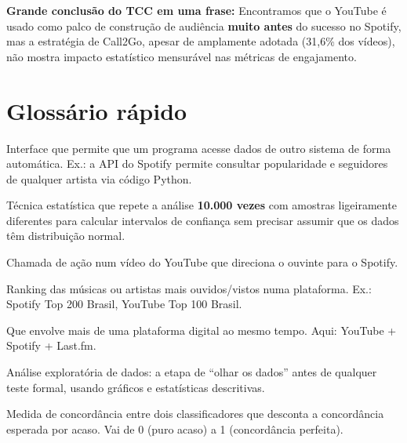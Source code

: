 \documentclass[12pt,a4paper]{article}
\newcommand{\num}[1]{\textcolor{azul}{\textbf{#1}}}
\newcommand{\term}[1]{\textcolor{roxo}{\textit{#1}}}
\begin{document}
\textbf{Grande conclusão do TCC em uma frase:} Encontramos que o YouTube é
usado como palco de construção de audiência \textbf{muito antes} do sucesso no
Spotify, mas a estratégia de Call2Go, apesar de amplamente adotada (31,6\%
dos vídeos), não mostra impacto estatístico mensurável nas métricas de
engajamento.

\section{Glossário rápido}

\begin{description}[leftmargin=1.8em]

  \item[\term{API}] Interface que permite que um programa acesse dados de
        outro sistema de forma automática. Ex.: a API do Spotify permite
        consultar popularidade e seguidores de qualquer artista via código
        Python.

  \item[\term{Bootstrap (IC 95\%)}] Técnica estatística que repete a análise
        \num{10.000 vezes} com amostras ligeiramente diferentes para calcular
        intervalos de confiança sem precisar assumir que os dados têm
        distribuição normal.

  \item[\term{Call2Go}] Chamada de ação num vídeo do YouTube que direciona o
        ouvinte para o Spotify.

  \item[\term{Chart}] Ranking das músicas ou artistas mais ouvidos/vistos numa
        plataforma. Ex.: Spotify Top 200 Brasil, YouTube Top 100 Brasil.

  \item[\term{Cross-platform}] Que envolve mais de uma plataforma digital ao
        mesmo tempo. Aqui: YouTube + Spotify + Last.fm.

  \item[\term{EDA (Exploratory Data Analysis)}] Análise exploratória de dados:
        a etapa de ``olhar os dados'' antes de qualquer teste formal, usando
        gráficos e estatísticas descritivas.

  \item[\term{Kappa de Cohen ($\kappa$)}] Medida de concordância entre dois
        classificadores que desconta a concordância esperada por acaso. Vai de
        0 (puro acaso) a 1 (concordância perfeita).


\end{description}
\end{document}
